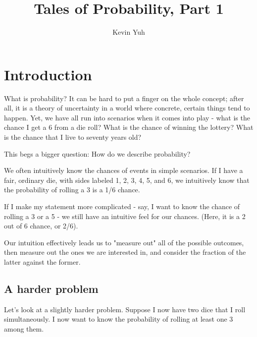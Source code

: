 \documentclass{article}
\title{Tales of Probability, Part 1}
\author{Kevin Yuh}
\begin{document}
\maketitle


\section{Introduction}

What is probability? It can be hard to put a finger on the whole concept; after all, it is a theory of uncertainty in a world where concrete, certain things tend to happen. Yet, we have all run into scenarios when it comes into play - what is the chance I get a 6 from a die roll? What is the chance of winning the lottery? What is the chance that I live to seventy years old?


This begs a bigger question: How do we describe probability? 

We often intuitively know the chances of events in simple scenarios. If I have a fair, ordinary die, with sides labeled 1, 2, 3, 4, 5, and 6, we intuitively know that the probability of rolling a 3 is a 1/6 chance. 

If I make my statement more complicated - say, I want to know the chance of rolling a 3 or a 5 - we still have an intuitive feel for our chances. (Here, it is a 2 out of 6 chance, or 2/6). 

Our intuition effectively leads us to "measure out" all of the possible outcomes, then measure out the ones we are interested in, and consider the fraction of the latter against the former. 

\subsection{A harder problem}

Let's look at a slightly harder problem. Suppose I now have two dice that I roll simultaneously. I now want to know the probability of rolling at least one 3 among them.
\end{document}
